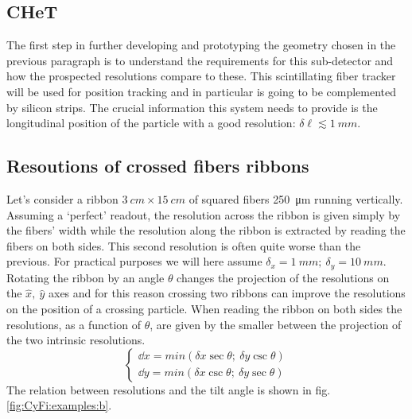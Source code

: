 \begin{refsection}
\section{CHeT}
    The first step in further developing and prototyping the geometry chosen in the previous paragraph is to understand the requirements for this sub-detector and how the prospected resolutions compare to these.
    This scintillating fiber tracker will be used for position tracking and in particular is going to be complemented by silicon strips. The crucial information this system needs to provide is the longitudinal position of the particle with a good resolution: $\delta \ell \lesssim \SI{1}{mm}$.

    \subsection{Resoutions of crossed fibers ribbons}
        Let's consider a ribbon  $\SI{3}{cm}\times\SI{15}{cm}$ of squared fibers \SI{250}{\micro m} running vertically. Assuming a `perfect' readout, the resolution across the ribbon is given simply by the fibers' width while the resolution along the ribbon is extracted by reading the fibers on both sides. This second resolution is often quite worse than the previous. For practical purposes we will here assume $\delta_x = \SI{1}{mm};\ \delta_y = \SI{10}{mm}$.
        Rotating the ribbon by an angle $\theta$ changes the projection of the resolutions on the $\hat{x},\ \hat{y}$ axes and for this reason crossing two ribbons can improve the resolutions on the position of a crossing particle.
        When reading the ribbon on both sides the resolutions, as a function of $\theta$, are given by the smaller between the projection of the two intrinsic resolutions.  
        \begin{equation}
            \begin{cases}
            \dd x = min(\delta x \sec \theta;\ \delta y \csc \theta)\\
            \dd y = min(\delta x \csc \theta;\ \delta y \sec \theta)
            \end{cases}
        \end{equation}
        The relation between resolutions and the tilt angle is shown in fig. \ref{fig:CyFi:examples:b}.  


\end{refsection}
